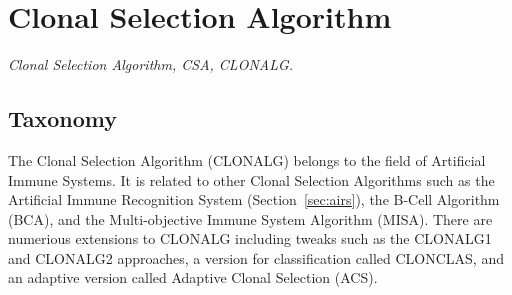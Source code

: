 

\section{Clonal Selection Algorithm} 
\label{sec:clonal_selection_algorithm}

\emph{Clonal Selection Algorithm, CSA, CLONALG.}

\subsection{Taxonomy}
The Clonal Selection Algorithm (CLONALG) belongs to the field of Artificial Immune Systems.
It is related to other Clonal Selection Algorithms such as the Artificial Immune Recognition System (Section~\ref{sec:airs}), the B-Cell Algorithm (BCA), and the Multi-objective Immune System Algorithm (MISA).
There are numerious extensions to CLONALG including tweaks such as the CLONALG1 and CLONALG2 approaches, a version for classification called CLONCLAS,  and an adaptive version called Adaptive Clonal Selection (ACS).

